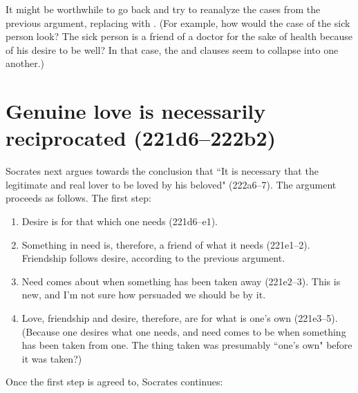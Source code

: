 \documentclass[11pt]{article}
\begin{document}
It might be worthwhile to go back and try to reanalyze the cases from the
previous argument, replacing  with .  (For example, how
would the case of the sick person look?  The sick person is a friend of
a doctor for the sake of health because of his desire to be well?  In that
case, the  and  clauses seem to
collapse into one another.)


\section{Genuine love is necessarily reciprocated (221d6--222b2)}

Socrates next argues towards the conclusion that ``It is necessary that the
legitimate and real lover to be loved by his beloved" (222a6--7).  The argument
proceeds as follows.  The first step:

\begin{enumerate}

    \item Desire is for that which one needs (221d6--e1).

    \item Something in need is, therefore, a friend of what it needs
        (221e1--2).  Friendship follows desire, according to the previous
        argument.

    \item Need comes about when something has been taken away (221e2--3).  This
        is new, and I'm not sure how persuaded we should be by it.

    \item Love, friendship and desire, therefore, are for what is one's own
        (221e3--5).  (Because one desires what one needs, and need comes to be
        when something has been taken from one.  The thing taken was presumably
        ``one's own" before it was taken?)

\end{enumerate}

Once the first step is agreed to, Socrates continues:
\end{document}
